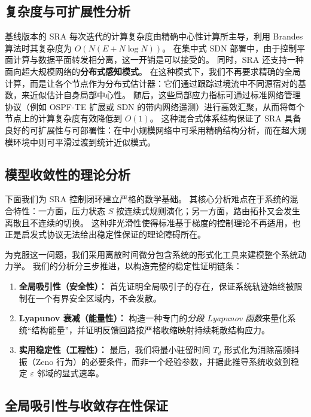 \documentclass[journal]{IEEEtran}
\theoremstyle{plain}
\theoremstyle{definition}
\begin{document}
\subsection*{复杂度与可扩展性分析}

基线版本的 SRA 每次迭代的计算复杂度由精确中心性计算所主导，利用 Brandes 算法时其复杂度为 $O(N(E + N \log N))$。
在集中式 SDN 部署中，由于控制平面计算与数据平面转发相分离，这一开销是可以接受的。
同时，SRA 还支持一种面向超大规模网络的\textbf{分布式感知模式}。
在这种模式下，我们不再要求精确的全局计算，而是让各个节点作为分布式估计器：它们通过跟踪过境流中不同源宿对的基数，来近似估计自身局部中心性。
随后，这些局部应力指标可通过标准网络管理协议（例如 OSPF-TE 扩展或 SDN 的带内网络遥测）进行高效汇聚，从而将每个节点上的计算复杂度有效降低到 $O(1)$。
这种混合式体系结构保证了 SRA 具备良好的可扩展性与可部署性：在中小规模网络中可采用精确结构分析，而在超大规模环境中则可平滑过渡到统计近似模式。

\subsection{模型收敛性的理论分析}
\label{sec:convergence_analysis}

下面我们为 SRA 控制闭环建立严格的数学基础。
其核心分析难点在于系统的混合特性：一方面，压力状态 $S$ 按连续式规则演化；另一方面，路由拓扑又会发生离散且不连续的切换。
这种非光滑性使得标准基于梯度的控制理论不再适用，也正是启发式协议无法给出稳定性保证的理论障碍所在。

为克服这一问题，我们采用离散时间微分包含系统的形式化工具来建模整个系统动力学。
我们的分析分三步推进，以构造完整的稳定性证明链条：
\begin{enumerate}
    \item \textbf{全局吸引性（安全性）：} 首先证明全局吸引子的存在，保证系统轨迹始终被限制在一个有界安全区域内，不会发散。
    \item \textbf{Lyapunov 衰减（能量性）：} 构造一种专门的\textit{分段 Lyapunov 函数}来量化系统“结构能量”，并证明反馈回路按严格收缩映射持续耗散结构应力。
    \item \textbf{实用稳定性（工程性）：} 最后，我们将最小驻留时间 $T_d$ 形式化为消除高频抖振（Zeno 行为）的必要条件，而非一个经验参数，并据此推导系统收敛到稳定 $\varepsilon$ 邻域的显式速率。
\end{enumerate}

\subsection{全局吸引性与收敛存在性保证}
\label{subsec:attractivity}
\end{document}
